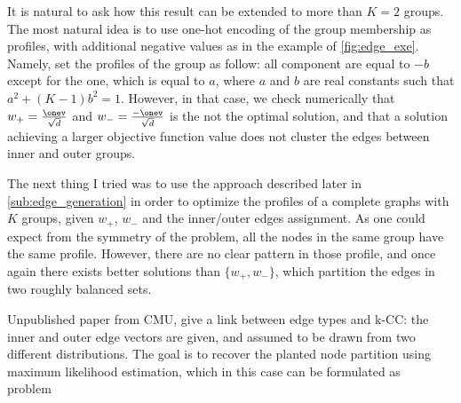 \begin{aside}
  It is natural to ask how this result can be extended to more than $K=2$ groups. The most natural
  idea is to use one-hot encoding of the group membership as profiles, with additional negative
  values as in the example of \autoref{fig:edge_exe}. Namely, set the profiles of the \ith{} group
  as follow: all component are equal to $-b$ except for the \ith{} one, which is equal to $a$, where
  $a$ and $b$ are real constants such that $a^2 + (K-1)b^2=1$. However, in that case, we check
  numerically that $w_+ = \frac{\onev}{\sqrt{d}}$ and $w_- = \frac{-\onev}{\sqrt{d}}$ is the not the
  optimal solution, and that a solution achieving a larger objective function value does not cluster
  the edges between inner and outer groups.

  The next thing I tried was to use the approach described later in \autoref{sub:edge_generation} in
  order to optimize the profiles of a complete graphs with $K$ groups, given $w_+$, $w_-$ and the
  inner/outer edges assignment. As one could expect from the symmetry of the problem, all the nodes
  in the same group have the same profile. However, there are no clear pattern in those profile, and
  once again there exists better solutions than $\{w_+, w_-\}$, which partition the edges in two
  roughly balanced sets.
\end{aside}

Unpublished paper from CMU, give a link between edge types and k-CC: the inner and outer edge
vectors are given, and assumed to be drawn from two different distributions. The goal is to recover
the planted node partition using maximum likelihood estimation, which in this case can be formulated
as \mind{} \pcc{} problem~\autocite{Barnes2016a}
